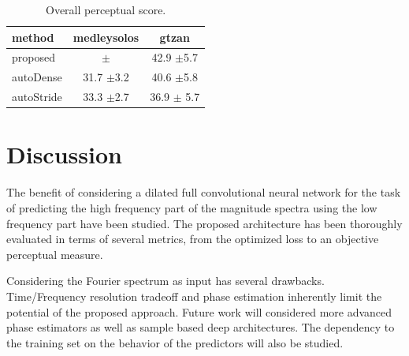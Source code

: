 \documentclass{article}
\begin{document}


\begin{table}[t]
\begin{center}
\begin{tabular}{lcc}
method & medleysolos & gtzan \\
\hline
proposed & $\pm$ & 42.9 $\pm$5.7 \\
autoDense & 31.7 $\pm$3.2 & 40.6 $\pm$5.8 \\
autoStride & 33.3 $\pm$2.7 & 36.9 $\pm$ 5.7 \\
\end{tabular}
\caption{Overall perceptual score.}
\end{center}
\label{tab:ops}
\vspace{-4mm}
\end{table}

\section{Discussion}
\label{sec:discussion}

The benefit of considering a dilated full convolutional neural network for the task of predicting the high frequency part of the magnitude spectra using the low frequency part have been studied. The proposed architecture has been thoroughly evaluated in terms of several metrics, from the optimized loss to an objective perceptual measure.

Considering the Fourier spectrum as input has several drawbacks. Time/Frequency resolution tradeoff and phase estimation inherently limit the potential of the proposed approach. Future work will considered more advanced phase estimators as well as sample based deep architectures. The dependency to the training set on the behavior of the predictors will also be studied.
\end{document}

